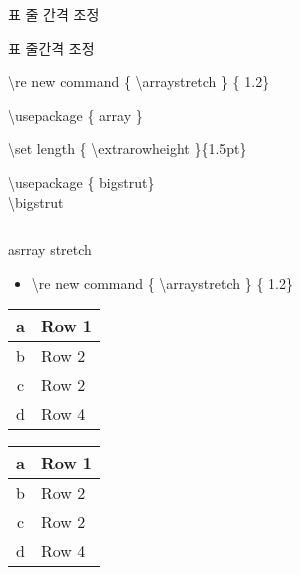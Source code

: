 \documentclass[ aspectratio=149,  14pt,blue,xcolor=pdftex,dvipsnames,table,handout,notes]{beamer}
\begin{document}
		\begin{frame}[t]{표 줄 간격 조정}

		\begin{block}{표 줄간격 조정}
		\begin{description}[12345678901234567890]
		\item[asrray stretch] 		\textbackslash re new command \{ \textbackslash arraystretch \} \{ 1.2\}
		\item[extra row height]	\textbackslash usepackage \{ array \} \par
								\textbackslash set length \{ \textbackslash extrarowheight \}\{1.5pt\}
		\item[big strut]			\textbackslash usepackage \{ bigstrut\} \\
								\textbackslash bigstrut
		\end{description}
		\end{block}
		
		\begin{columns}[t]
		\begin{column}{0.3\textwidth}
		\begin{block}{asrray stretch}
		\begin{itemize}
		\item[] \textbackslash re new command \{ \textbackslash arraystretch \} \{ 1.2\}
		\end{itemize}
		\end{block}
		{
		\renewcommand{\arraystretch}{1.2}
		\begin{tabular}{|c|l|}
		\hline
		a & Row 1 \\ \hline
		b & Row 2 \\ \hline
		c & Row 2 \\
		d & Row 4 \\ \hline
		\end{tabular}
		}

		{
		\renewcommand{\arraystretch}{2.0}
		\begin{tabular}{|c|l|}
		\hline
		a & Row 1 \\ \hline
		b & Row 2 \\ \hline
		c & Row 2 \\
		d & Row 4 \\ \hline
		\end{tabular}
		}



\end{column}
\end{columns}
\end{frame}
\end{document}
